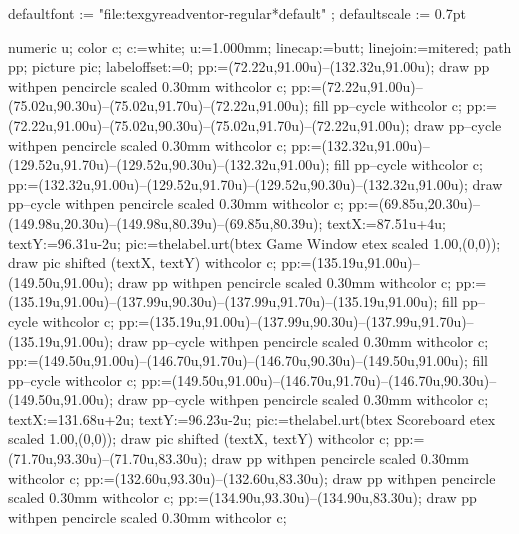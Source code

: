 
\setupwhitespace[medium]
\setuppagenumbering[location=]

\setupbackend[
  format=PDF,
  background=transparent
]

\startTEXpage[offset=0pt]

\startMPinitializations
defaultfont := "file:texgyreadventor-regular*default" ;
defaultscale := 0.7pt
\stopMPinitializations

numeric u;
color c;
c:=white;
u:=1.000mm; linecap:=butt; linejoin:=mitered; path pp; picture pic; labeloffset:=0;
pp:=(72.22u,91.00u)--(132.32u,91.00u);
draw pp withpen pencircle scaled 0.30mm withcolor c;
pp:=(72.22u,91.00u)--(75.02u,90.30u)--(75.02u,91.70u)--(72.22u,91.00u);
fill pp--cycle withcolor c;
pp:=(72.22u,91.00u)--(75.02u,90.30u)--(75.02u,91.70u)--(72.22u,91.00u);
draw pp--cycle withpen pencircle scaled 0.30mm withcolor c;
pp:=(132.32u,91.00u)--(129.52u,91.70u)--(129.52u,90.30u)--(132.32u,91.00u);
fill pp--cycle withcolor c;
pp:=(132.32u,91.00u)--(129.52u,91.70u)--(129.52u,90.30u)--(132.32u,91.00u);
draw pp--cycle withpen pencircle scaled 0.30mm withcolor c;
pp:=(69.85u,20.30u)--(149.98u,20.30u)--(149.98u,80.39u)--(69.85u,80.39u);
textX:=87.51u+4u; textY:=96.31u-2u; pic:=thelabel.urt(btex {Game Window} etex scaled 1.00,(0,0)); draw pic shifted (textX, textY) withcolor c;
pp:=(135.19u,91.00u)--(149.50u,91.00u);
draw pp withpen pencircle scaled 0.30mm withcolor c;
pp:=(135.19u,91.00u)--(137.99u,90.30u)--(137.99u,91.70u)--(135.19u,91.00u);
fill pp--cycle withcolor c;
pp:=(135.19u,91.00u)--(137.99u,90.30u)--(137.99u,91.70u)--(135.19u,91.00u);
draw pp--cycle withpen pencircle scaled 0.30mm withcolor c;
pp:=(149.50u,91.00u)--(146.70u,91.70u)--(146.70u,90.30u)--(149.50u,91.00u);
fill pp--cycle withcolor c;
pp:=(149.50u,91.00u)--(146.70u,91.70u)--(146.70u,90.30u)--(149.50u,91.00u);
draw pp--cycle withpen pencircle scaled 0.30mm withcolor c;
textX:=131.68u+2u; textY:=96.23u-2u; pic:=thelabel.urt(btex {Scoreboard} etex scaled 1.00,(0,0)); draw pic shifted (textX, textY) withcolor c;
pp:=(71.70u,93.30u)--(71.70u,83.30u);
draw pp withpen pencircle scaled 0.30mm withcolor c;
pp:=(132.60u,93.30u)--(132.60u,83.30u);
draw pp withpen pencircle scaled 0.30mm withcolor c;
pp:=(134.90u,93.30u)--(134.90u,83.30u);
draw pp withpen pencircle scaled 0.30mm withcolor c;
